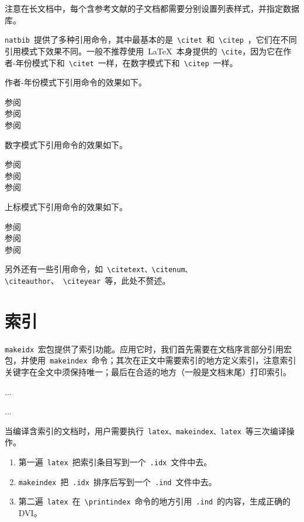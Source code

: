 注意在长文档中，每个含参考文献的子文档都需要分别设置列表样式，并指定数据库。

\verb|natbib|~提供了多种引用命令，其中最基本的是~\verb|\citet|~和~\verb|\citep|~，它们在不同引用模式下效果不同。一般不推荐使用~\LaTeX~本身提供的~\verb|\cite|，因为它在作者-年份模式下和~\verb|\citet|~一样，在数字模式下和~\verb|\citep|~一样。

作者-年份模式下引用命令的效果如下。
\begin{demo}
参阅\cite{Daly_2007}\\
参阅\citet{Daly_2007}\\
参阅\citep{Daly_2007}
\end{demo}

数字模式下引用命令的效果如下。
\begin{demo}
参阅\cite{Daly_2007}\\
参阅\citet{Daly_2007}\\
参阅\citep{Daly_2007}
\end{demo}

上标模式下引用命令的效果如下。
\begin{demo}
参阅\cite{Daly_2007}\\
参阅\citet{Daly_2007}\\
参阅\citep{Daly_2007}
\end{demo}

另外还有一些引用命令，如~\verb|\citetext、\citenum、\citeauthor|、~\verb|\citeyear|~等，此处不赘述。

\section{索引}
\verb|makeidx|~宏包提供了索引功能。应用它时，我们首先需要在文档序言部分引用宏包，并使用~\verb|makeindex|~命令；其次在正文中需要索引的地方定义索引，注意索引关键字在全文中须保持唯一；最后在合适的地方（一般是文档末尾）打印索引。

\begin{code}
\usepackage{makeidx}
\makeindex
...

...
\printindex

\end{code}

当编译含索引的文档时，用户需要执行~\verb|latex、makeindex、latex|~等三次编译操作。

\begin{enumerate}
    \item 第一遍~\verb|latex|~把索引条目写到一个~\verb|.idx|~文件中去。
    \item \verb|makeindex|~把~\verb|.idx|~排序后写到一个~\verb|.ind|~文件中去。
    \item 第二遍~\verb|latex|~在~\verb|\printindex|~命令的地方引用~\verb|.ind|~的内容，生成正确的DVI。
\end{enumerate}

